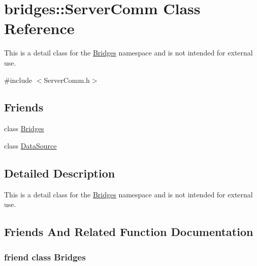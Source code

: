 \hypertarget{classbridges_1_1_server_comm}{}\section{bridges\+:\+:Server\+Comm Class Reference}
\label{classbridges_1_1_server_comm}


This is a detail class for the \hyperlink{classbridges_1_1_bridges}{Bridges} namespace and is not intended for external use.  




{\ttfamily \#include $<$Server\+Comm.\+h$>$}

\subsection*{Friends}
\begin{DoxyCompactItemize}
\item 
class \hyperlink{classbridges_1_1_server_comm_a1e7012f84e4df45aa77f36ad8d8375eb}{Bridges}
\item 
class \hyperlink{classbridges_1_1_server_comm_a7998ddaa8bd7c3b9a7cd2a8cbf3573c4}{Data\+Source}
\end{DoxyCompactItemize}


\subsection{Detailed Description}
This is a detail class for the \hyperlink{classbridges_1_1_bridges}{Bridges} namespace and is not intended for external use. 

\subsection{Friends And Related Function Documentation}
\hypertarget{classbridges_1_1_server_comm_a1e7012f84e4df45aa77f36ad8d8375eb}{}
\subsubsection[{Bridges}]{\setlength{\rightskip}{0pt plus 5cm}friend class {\bf Bridges}\hspace{0.3cm}{\ttfamily [friend]}}\label{classbridges_1_1_server_comm_a1e7012f84e4df45aa77f36ad8d8375eb}
\hypertarget{classbridges_1_1_server_comm_a7998ddaa8bd7c3b9a7cd2a8cbf3573c4}{}
